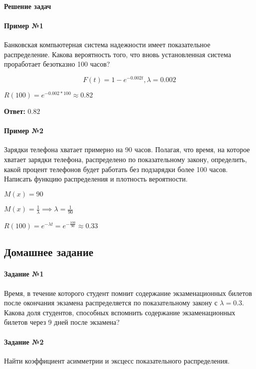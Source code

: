 \documentclass{article}
\begin{document}
\paragraph{Решение задач}

\paragraph{Пример №1} Банковская компьютерная система надежности имеет показательное распределение. Какова вероятность того, что вновь установленная система проработает безотказно 100 часов?

$$F(t) = 1 - e^{-0.002 t}, \lambda = 0.002$$

$R(100) = e^{-0.002 * 100} \approx 0.82$

\textbf{Ответ:} $0.82$

\paragraph{Пример №2} Зарядки телефона хватает примерно на 90 часов. Полагая, что время, на которое хватает зарядки телефона, распределено по показательному закону, определить, какой процент телефонов будет работать без подзарядки более 100 часов. Написать функцию распределения и плотность вероятности.

$M(x) = 90$

$M(x) = \frac{1}{\lambda} \implies \lambda = \frac{1}{90}$

$R(100) = e^{-\lambda t} = e^{-\frac{100}{90}} \approx 0.33$

\subsection{Домашнее задание}

\paragraph{Задание №1} Время, в течение которого студент помнит содержание экзаменационных билетов после окончания экзамена распределяется по показательному закону с $\lambda = 0.3$. Какова доля студентов, способных вспомнить содержание экзаменационных билетов через 9 дней после экзамена?

\paragraph{Задание №2} Найти коэффициент асимметрии и эксцесс показательного распределения.
\end{document}
